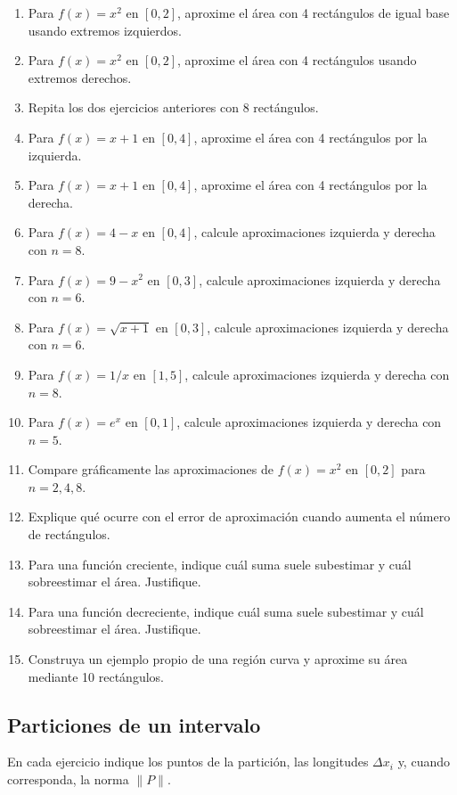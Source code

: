 \documentclass[12pt]{article}
\begin{document}
\begin{enumerate}[resume]
\item Para $f(x)=x^2$ en $[0,2]$, aproxime el área con 4 rectángulos de igual base usando extremos izquierdos.
\item Para $f(x)=x^2$ en $[0,2]$, aproxime el área con 4 rectángulos usando extremos derechos.
\item Repita los dos ejercicios anteriores con 8 rectángulos.
\item Para $f(x)=x+1$ en $[0,4]$, aproxime el área con 4 rectángulos por la izquierda.
\item Para $f(x)=x+1$ en $[0,4]$, aproxime el área con 4 rectángulos por la derecha.
\item Para $f(x)=4-x$ en $[0,4]$, calcule aproximaciones izquierda y derecha con $n=8$.
\item Para $f(x)=9-x^2$ en $[0,3]$, calcule aproximaciones izquierda y derecha con $n=6$.
\item Para $f(x)=\sqrt{x+1}$ en $[0,3]$, calcule aproximaciones izquierda y derecha con $n=6$.
\item Para $f(x)=1/x$ en $[1,5]$, calcule aproximaciones izquierda y derecha con $n=8$.
\item Para $f(x)=e^x$ en $[0,1]$, calcule aproximaciones izquierda y derecha con $n=5$.
\item Compare gráficamente las aproximaciones de $f(x)=x^2$ en $[0,2]$ para $n=2,4,8$.
\item Explique qué ocurre con el error de aproximación cuando aumenta el número de rectángulos.
\item Para una función creciente, indique cuál suma suele subestimar y cuál sobreestimar el área. Justifique.
\item Para una función decreciente, indique cuál suma suele subestimar y cuál sobreestimar el área. Justifique.
\item Construya un ejemplo propio de una región curva y aproxime su área mediante 10 rectángulos.
\end{enumerate}
\subsection{Particiones de un intervalo}
En cada ejercicio indique los puntos de la partición, las longitudes $\Delta x_i$ y, cuando corresponda, la norma $\|P\|$.
\end{document}
